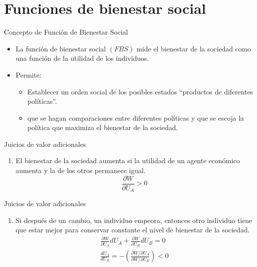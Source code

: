 \section{Funciones de bienestar social}

\begin{frame}{Concepto de Función de Bienestar Social}
	\begin{itemize}
		\item La función de bienestar social $(FBS)$ mide el bienestar de la sociedad como una función de la utilidad de los individuos.
		
		\item Permite:
				\begin{itemize}
					\item Establecer un orden social de los posibles estados ``productos de diferentes políticas''.
					\item que se hagan comparaciones entre diferentes políticas y que se escoja la política que maximiza el bienestar de la sociedad.
				\end{itemize}
	\end{itemize}
\end{frame}
\begin{frame}{Juicios de valor adicionales}
	\begin{enumerate}
		\item El bienestar de la sociedad aumenta si la utilidad de un agente económico aumenta y la de los otros permanece igual.
				$$\frac{\partial W}{\partial U_A} > 0$$
	\end{enumerate}
\end{frame}
\begin{frame}{Juicios de valor adicionales}
	\begin{enumerate}[2]
		\item Si después de un cambio, un individuo empeora, entonces otro individuo tiene
		que estar mejor para conservar constante el nivel de bienestar de la sociedad.
				\begin{gather*}
					\frac{\partial W}{\partial U_A}dU_A + \frac{\partial W}{\partial U_B}dU_B = 0 \\[0.4cm]
					\frac{dU_A}{dU_B}  = -\left(\frac{\partial W/\partial U_A}{\partial W/\partial U_B} \right) < 0
				\end{gather*}
	\end{enumerate}
\end{frame}
